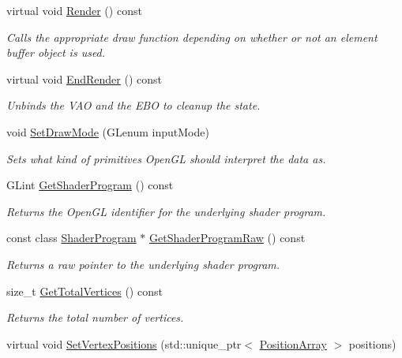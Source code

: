 \begin{DoxyCompactItemize}
virtual void \hyperlink{class_rendering_object_a5fdb7a1b2d53b7ce024a4eeabd9c86d3}{Render} () const 
\begin{DoxyCompactList}\small\item\em Calls the appropriate draw function depending on whether or not an element buffer object is used. \end{DoxyCompactList}\item 
virtual void \hyperlink{class_rendering_object_a2a038472f934360acddd26f4e992b28b}{End\+Render} () const 
\begin{DoxyCompactList}\small\item\em Unbinds the V\+A\+O and the E\+B\+O to cleanup the state. \end{DoxyCompactList}\item 
void \hyperlink{class_rendering_object_aa627eb310f11d0e04dbbb3665f58bb4e}{Set\+Draw\+Mode} (G\+Lenum input\+Mode)
\begin{DoxyCompactList}\small\item\em Sets what kind of primitives Open\+G\+L should interpret the data as. \end{DoxyCompactList}\item 
G\+Lint \hyperlink{class_rendering_object_a80658debd2668b55a3c9fe86ec9f49fb}{Get\+Shader\+Program} () const 
\begin{DoxyCompactList}\small\item\em Returns the Open\+G\+L identifier for the underlying shader program. \end{DoxyCompactList}\item 
const class \hyperlink{class_shader_program}{Shader\+Program} $\ast$ \hyperlink{class_rendering_object_ac9187166c98131aab185111e105528c2}{Get\+Shader\+Program\+Raw} () const 
\begin{DoxyCompactList}\small\item\em Returns a raw pointer to the underlying shader program. \end{DoxyCompactList}\item 
size\+\_\+t \hyperlink{class_rendering_object_a3bb36683836c8c177984aa928cb1fb04}{Get\+Total\+Vertices} () const 
\begin{DoxyCompactList}\small\item\em Returns the total number of vertices. \end{DoxyCompactList}\item 
virtual void \hyperlink{class_rendering_object_ada51886b7da1924a17d3a55e8fe90061}{Set\+Vertex\+Positions} (std\+::unique\+\_\+ptr$<$ \hyperlink{class_rendering_object_a1223b9cf03f2029b9c43d71042c2a18e}{Position\+Array} $>$ positions)

\end{DoxyCompactItemize}
